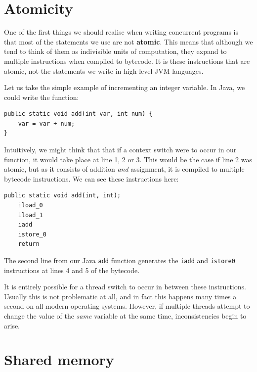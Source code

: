 \documentclass[a4paper,12pt]{kth-mag}
\begin{document}
\section{Atomicity}

One of the first things we should realise when writing concurrent programs is that most of the statements we use are not \textbf{atomic}. This means that although we tend to think of them as indivisible units of computation, they expand to multiple instructions when compiled to bytecode. It is these instructions that are atomic, not the statements we write in high-level JVM languages.

Let us take the simple example of incrementing an integer variable. In Java, we could write the function:

\begin{listing}[H]
\begin{verbatim}
public static void add(int var, int num) { 
	var = var + num; 
}
\end{verbatim}
\end{listing}

Intuitively, we might think that that if a context switch were to occur in our function, it would take place at line 1, 2 or 3. This would be the case if line 2 was atomic, but as it consists of addition \textit{and} assignment, it is compiled to multiple bytecode instructions. We can see these instructions here:

\begin{listing}[H]
	\begin{verbatim}
public static void add(int, int);
	iload_0
	iload_1
	iadd
	istore_0
	return
  	\end{verbatim}
\end{listing}

The second line from our Java \texttt{add} function generates the \texttt{iadd} and \texttt{istore0} instructions at lines 4 and 5 of the bytecode. 

It is entirely possible for a thread switch to occur in between these instructions. Usually this is not problematic at all, and in fact this happens many times a second on all modern operating systems. However, if multiple threads attempt to change the value of the \textit{same} variable at the same time, inconsistencies begin to arise. 

\section{Shared memory}
\end{document}
